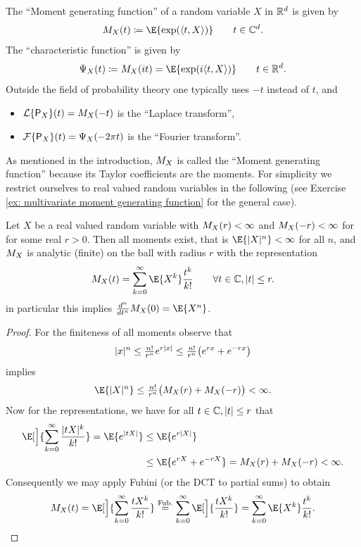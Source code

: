 \begin{definition}
    The ``Moment generating function'' of a random variable \(X\) in 
    \(\mathbb{R}^d\) is given by
    \[
        \MGF_X(t) \coloneq \E{\exp(\scp{t, X})}
        \qquad t\in \complex^\dims.
    \]
    The ``characteristic function'' is given by
    \[
        \charFct_X(t) \coloneq \MGF_X(i t) = \E{\exp(i\scp{t,X})}
        \qquad t\in \real^\dims.
    \]
    Outside the field of probability theory one typically uses \(-t\) 
    instead of \(t\), and 
    \begin{itemize}[noitemsep]
        \item \(\mathcal{L}\{\mathsf{P}_X\}(t) = M_X(-t)\) is the ``Laplace
        transform'',
        \item \(\mathcal{F}\{\mathsf{P}_X\}(t) = \Psi_X(-2\pi t)\) is the ``Fourier
        transform''. 
    \end{itemize}
\end{definition}

As mentioned in the introduction, \(M_X\) is called the ``Moment
generating function'' because its Taylor coefficients are the moments.
For simplicity we restrict ourselves to real valued random variables
in the following (see Exercise \ref{ex: multivariate moment generating function}
for the general case).

\begin{lemma}
    \label{lem: moment generating function representation}
    Let \(X\) be a real valued random variable with \(M_{X}(r) < \infty\) and
    \(M_{X}(-r) < \infty\) for for some real \(r>0\). Then all moments exist,
    that is \(\E{\abs{X}^n} <\infty\) for all \(n\), and \(M_X\) is
    analytic (finite) on the ball with radius \(r\) with the representation
    \[
        \MGF_X(t) = \sum_{k=0}^\infty \E{X^k}\frac{t^k}{k!} \qquad \forall t\in \complex, |t| \le r.
    \]
    in particular this implies \(\frac{d^n}{dt^n} \MGF_X(0) = \E{X^n}\).
\end{lemma}
\begin{proof}
    For the finiteness of all moments observe that
    \[
        \lvert x\rvert^n
        \le \tfrac{n!}{r^n} e^{r\lvert x\rvert}
        \le \tfrac{n!}{r^n} \bigl(e^{r x} + e^{-r x}\bigr)
    \]
    implies
    \[
        \E{\abs{X}^n} \le \tfrac{n!}{r^n} \bigl(\MGF_X(r) + \MGF_X(-r)\bigr) < \infty.
    \]
    Now for the representations, we have for all \(t\in \mathbb{C}, |t| \le r\)
    that
    \[\begin{aligned}
        \E[\Big]{\sum_{k=0}^\infty \frac{\abs{tX}^k}{k!}}
        = \E{e^{\abs{tX}}}
        &\le \E{e^{r\abs{X}}}
        \\
        &\le \E{e^{r X} + e^{-r X}}
        = \MGF_X(r) + \MGF_X(-r) < \infty.
    \end{aligned}
    \]
    Consequently we may apply Fubini (or the DCT to partial sums) to obtain
    \[
        \MGF_X(t)
        = \E[\Big]{\sum_{k=0}^\infty \frac{tX^k}{k!}}
        \overset{\text{Fub.}}= 
        \sum_{k=0}^\infty \E[\Big]{\frac{tX^k}{k!}}
        = \sum_{k=0}^\infty \E{X^k}\frac{t^k}{k!}.
        \qedhere
    \]
\end{proof}

